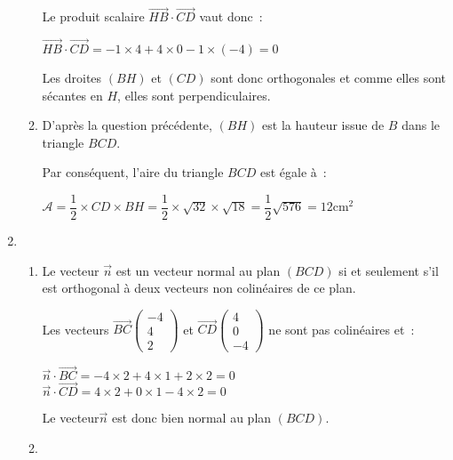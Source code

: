 \begin{corrige}
\begin{enumerate}
\begin{enumerate}[label=\alph*.]
               \par
               Le produit scalaire $\overrightarrow{HB} \cdot \overrightarrow{CD} $ vaut donc~:
               \par
               $\overrightarrow{HB}\cdot \overrightarrow{CD} = -1 \times 4+ 4 \times 0-1 \times (-4)= 0$
               \par
               Les droites $(BH)$ et $(CD)$ sont donc orthogonales et comme elles sont sécantes en $H$, elles sont perpendiculaires.
               \item
               D'après la question précédente, $(BH)$ est la hauteur issue de $B$ dans le triangle $BCD$.
               \par
               Par conséquent, l'aire du triangle $BCD$ est égale à~:
               \par
               $\mathscr{A}=\dfrac{1}{2} \times  CD \times  BH$\nosp$=\dfrac{1}{2}\times \sqrt{32} \times  \sqrt{18}$\nosp$=\dfrac{1}{2}\sqrt{576}=12$cm$^2$
          \end{enumerate}
          \item
          \begin{enumerate}[label=\alph*.]
               \item
               Le vecteur $\overrightarrow{n}$ est un vecteur normal au plan $(BCD)$ si et seulement s'il  est orthogonal à deux vecteurs non colinéaires de ce plan.
               \par
               Les vecteurs
               $\overrightarrow{BC}\begin{pmatrix}
                    -4\\4\\2
                    \end{pmatrix}$ et $\overrightarrow{CD}\begin{pmatrix}
                    4\\0\\-4
               \end{pmatrix}$ ne sont
               pas colinéaires et~:
               \par
               $\overrightarrow{n}\cdot\overrightarrow{BC}=-4 \times 2+4 \times 1+2\times 2=0$\\
               $\overrightarrow{n}\cdot\overrightarrow{CD}=4 \times 2+0\times 1-4\times 2=0$
               \par
               Le vecteur$\overrightarrow{n}$ est donc bien normal au plan $(BCD)$.
               \item

\end{enumerate}
\end{enumerate}
\end{corrige}
